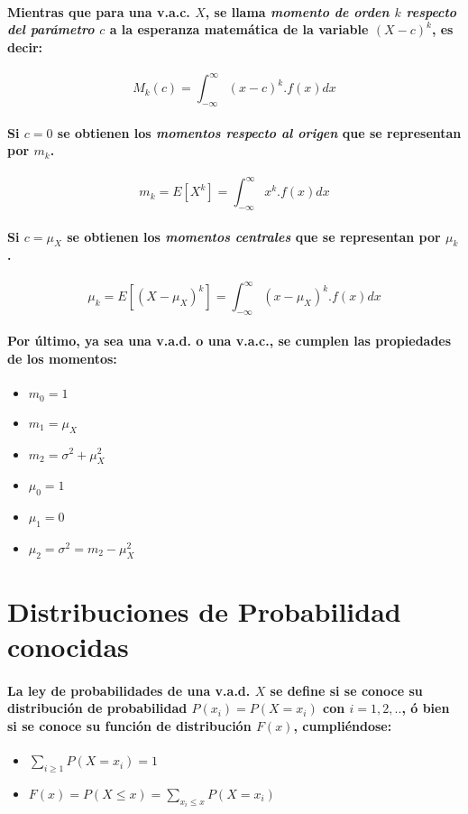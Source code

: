 \paragraph{
Mientras que para una v.a.c. $X$, se llama \emph{momento de orden $k$ respecto del parámetro $c$} a la esperanza matemática de la variable $(X - c)^k$, es decir:
}
\begin{equation}
M_k(c) = \int_{-\infty}^\infty (x - c)^k . f(x) dx
\end{equation}
\paragraph{
Si $c = 0$ se obtienen los \emph{momentos respecto al origen} que se representan por $m_k$.
}
\begin{equation}
m_k = E[X^k] = \int_{-\infty}^\infty x^k . f(x) dx
\end{equation}
\paragraph{
Si $c = \mu_X$ se obtienen los \emph{momentos centrales} que se representan por $\mu_k$.
}
\begin{equation}
\mu_k = E[(X-\mu_X)^k] = \int_{-\infty}^\infty (x - \mu_X)^k . f(x) dx
\end{equation}
\paragraph{
Por último, ya sea una v.a.d. o una v.a.c., se cumplen las propiedades de los momentos:
}
\begin{itemize}
\item $m_0 = 1$
\item $m_1 = \mu_X$
\item $m_2 = \sigma^2 + \mu_X^2$
\item $\mu_0 = 1$
\item $\mu_1 = 0$
\item $\mu_2 = \sigma^2 = m_2 - \mu_X^2$
\end{itemize}



\section{Distribuciones de Probabilidad conocidas}
\paragraph{
La ley de probabilidades de una v.a.d. $X$ se define si se conoce su distribución de probabilidad $P(x_i) = P(X = x_i)$ con $i = 1, 2, ..$, ó bien si se conoce su función de distribución $F(x)$, cumpliéndose:
}
\begin{itemize}
\item $\displaystyle\sum_{i\geq1} P(X = x_i)=1$
\item $F(x) = P(X \leq x) = \displaystyle\sum_{x_i \leq x}P(X = x_i)$
\end{itemize}

